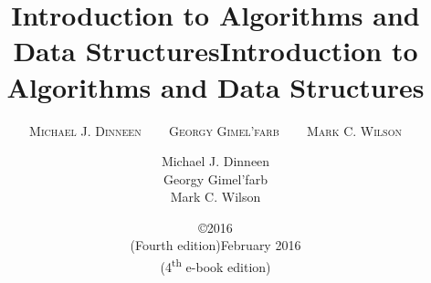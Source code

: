 \AddToShipoutPicture*{\BackgroundPic}

\pagestyle{220book}

\title{\color{white}\textbf{\CAP Introduction to \CAP Algorithms and \CAP Data \CAP Structures}}
\author{\color{yellow}\textsc{Michael J. Dinneen ~~~ Georgy Gimel'farb ~~~ Mark C. Wilson}\\[4.6in]}
\date{\color{white} \copyright 2016\\[2ex] (Fourth edition)}
\maketitle
\else
\title{\textbf{Introduction to Algorithms and Data Structures}\\[4ex]}
\author{Michael J. Dinneen \\ Georgy Gimel'farb \\ Mark C. Wilson\\[3in]}
\date{February 2016\\[2ex] (4\textsuperscript{th} e-book edition)}

\begin{titlingpage}
\thispagestyle{empty}
\maketitle
\end{titlingpage}
\fi